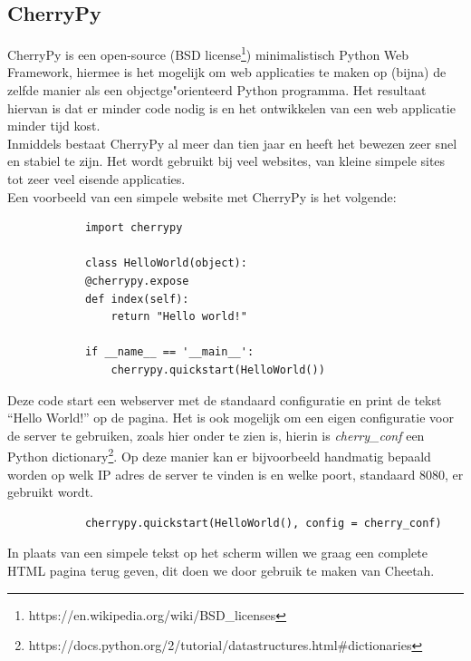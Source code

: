 \documentclass[twoside,openright]{uva-bachelor-thesis}
\begin{document}
		\subsection{CherryPy}
			CherryPy \cite{CherryPy} is een open-source (BSD license\footnote{https://en.wikipedia.org/wiki/BSD\_licenses}) minimalistisch Python Web Framework, hiermee is het mogelijk om web applicaties te maken op (bijna) de zelfde manier als een objectge"orienteerd Python programma. Het resultaat hiervan is dat er minder code nodig is en het ontwikkelen van een web applicatie minder tijd kost.
			\\[0.5cm]
			Inmiddels bestaat CherryPy al meer dan tien jaar en heeft het bewezen zeer snel en stabiel te zijn. Het wordt gebruikt bij veel websites, van kleine simpele sites tot zeer veel eisende applicaties.
			\\[0.5cm]
			Een voorbeeld van een simpele website met CherryPy is het volgende:
			\begin{verbatim}
			import cherrypy
			
			class HelloWorld(object):
			@cherrypy.expose
			def index(self):
			    return "Hello world!"
			
			if __name__ == '__main__':
			    cherrypy.quickstart(HelloWorld())
			\end{verbatim}
			Deze code start een webserver met de standaard configuratie en print de tekst ``Hello World!'' op de pagina. Het is ook mogelijk om een eigen configuratie voor de server te gebruiken, zoals hier onder te zien is, hierin is \textit{cherry\_conf} een Python dictionary\footnote{https://docs.python.org/2/tutorial/datastructures.html\#dictionaries}. Op deze manier kan er bijvoorbeeld handmatig bepaald worden op welk IP adres de server te vinden is en welke poort, standaard $8080$, er gebruikt wordt. 
			\begin{verbatim}
			cherrypy.quickstart(HelloWorld(), config = cherry_conf)
			\end{verbatim}
			In plaats van een simpele tekst op het scherm willen we graag een complete HTML pagina terug geven, dit doen we door gebruik te maken van Cheetah.
\end{document}
